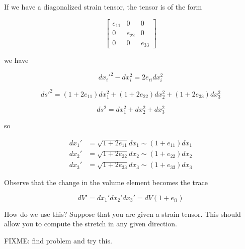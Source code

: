 If we have a diagonalized strain tensor, the tensor is of the form

\begin{equation}\label{eqn:continuumL3:110}
\begin{bmatrix}
e_{11} & 0 & 0 \\
0 & e_{22} & 0 \\
0 & 0 & e_{33} 
\end{bmatrix}
\end{equation}

we have

\begin{equation}\label{eqn:continuumL3:130}
{dx_i'}^2 - dx_i^2 = 2 e_{ii} dx_i^2
\end{equation}

\begin{equation}\label{eqn:continuumL3:150}
{ds'}^2 = 
(1 + 2 e_{11}) dx_1^2
+(1 + 2 e_{22}) dx_2^2
+(1 + 2 e_{33}) dx_3^2
\end{equation}

\begin{equation}\label{eqn:continuumL3:170}
ds^2 = 
dx_1^2
+dx_2^2
+dx_3^2
\end{equation}

so 

\begin{align}\label{eqn:continuumL3:190}
dx_1' &= \sqrt{1 + 2 e_{11}} dx_1 \sim ( 1 + e_{11}) dx_1 \\
dx_2' &= \sqrt{1 + 2 e_{22}} dx_2 \sim ( 1 + e_{22}) dx_2 \\
dx_3' &= \sqrt{1 + 2 e_{33}} dx_3 \sim ( 1 + e_{33}) dx_3
\end{align}

Observe that the change in the volume element becomes the trace

\begin{equation}\label{eqn:continuumL3:210}
dV' = 
dx_1'
dx_2'
dx_3'
= dV(1 + e_{ii})
\end{equation}

How do we use this?  Suppose that you are given a strain tensor.  This should allow you to compute the stretch in any given direction.

FIXME: find problem and try this.
